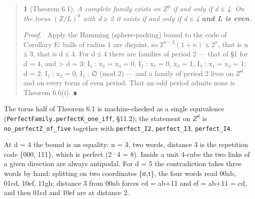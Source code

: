 \documentclass[11pt,a4paper]{article}
\theoremstyle{named}
\newtheorem*{namedthm}{}
\newenvironment{mdproof}[1][Proof]{\par\medskip\noindent\textit{#1.}\ }{\par\medskip}
\begin{document}
\begin{quote}
\begin{namedthm}[Theorem 6.1]
A complete family exists on $Z^d$ if and only if d ≤ 4. On the torus $(Z/L)^d$ with d ≥ 2 it exists if and only if d ≤ 4 \textbf{and L is even}.
\end{namedthm}
\begin{mdproof}[Proof]
Apply the Hamming (sphere-packing) bound to the code of Corollary E: balls of radius 1 are disjoint, so $2^{n−2}(1+n)$ ≤ $2^n$, that is n ≤ 3, that is d ≤ 4. For d ≤ 4 there are families of period 2 — that of §1 for d = 4, and \textgreater{} d = 3:  I₁ : x₂ = x₃ = 0,  I₂ : x₁ = 0, x₃ = 1,  I₃ : x₁ = x₂ = 1;   d = 2:  I₁ : x₂ = 0,  I₂ : ∅  (mod 2) — and a family of period 2 lives on $Z^d$ and on every torus of even period. That an odd period admits none is Theorem 6.6(i). ∎
\end{mdproof}
\end{quote}
The torus half of Theorem 6.1 is machine-checked as a single equivalence (\texttt{PerfectFamily.\allowbreak{}perfectK\_\allowbreak{}one\_\allowbreak{}iff}, §11.2); the statement on $Z^d$ is \texttt{no\_\allowbreak{}perfectZ\_\allowbreak{}of\_\allowbreak{}five} together with \texttt{perfect\_\allowbreak{}I2}, \texttt{perfect\_\allowbreak{}I3}, \texttt{perfect\_\allowbreak{}I4}.

At d = 4 the bound is an equality: n = 3, two words, distance 3 is the repetition code \{000, 111\}, which is perfect (2·4 = 8). Inside a unit 4-cube the two links of a given direction are always antipodal. For d = 5 the contradiction takes three words by hand: splitting on two coordinates \{σ,τ\}, the four words read 00ab, 01cd, 10ef, 11gh; distance 3 from 00ab forces cd = ab+11 and ef = ab+11 = cd, and then 01cd and 10ef are at distance 2.
\end{document}
